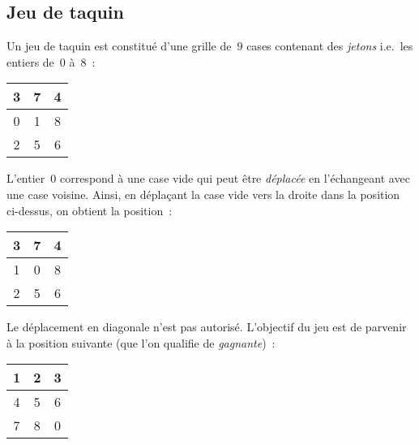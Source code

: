 \subsection{Jeu de taquin}
\label{sec:taquin}
Un jeu de taquin est constitu\'e d'une grille de~$9$ cases contenant
des \textit{jetons} i.e.\ les entiers de~$0$ \`a~$8$~:
\begin{center}
  \begin{tabular}{|c|c|c|}
    \hline
    3 & 7 & 4 \\ \hline 
    0 & 1 & 8 \\ \hline 
    2 & 5 & 6 \\ \hline 
  \end{tabular}
\end{center}
L'entier~$0$ correspond \`a une case vide qui peut \^etre
\textit{d\'eplac\'ee} en l'\'echangeant avec une case voisine. Ainsi,
en d\'epla\c{c}ant la case vide vers la droite dans la position
ci-dessus, on obtient la position~:
\begin{center}
  \begin{tabular}{|c|c|c|}
    \hline
    3 & 7 & 4 \\ \hline 
    1 & 0 & 8 \\ \hline 
    2 & 5 & 6 \\ \hline 
  \end{tabular}
\end{center}
Le d\'eplacement en diagonale n'est pas autoris\'e.  L'objectif du jeu
est de parvenir \`a la position suivante (que l'on qualifie de
\textit{gagnante})~:
\begin{center}
  \begin{tabular}{|c|c|c|}
    \hline
    1 & 2 & 3 \\ \hline 
    4 & 5 & 6 \\ \hline 
    7 & 8 & 0 \\ \hline 
  \end{tabular}
\end{center}
